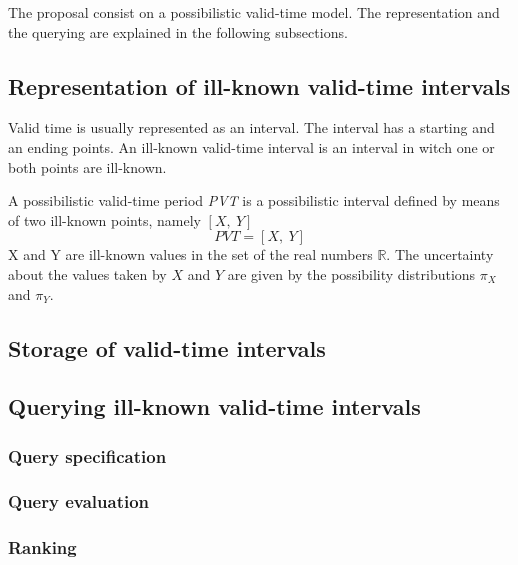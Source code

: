 The proposal consist on a possibilistic valid-time model. The representation and the querying are explained in the following subsections.

\subsection{Representation of ill-known valid-time intervals}
Valid time is usually represented as an interval. The interval has a starting and an ending points. An ill-known valid-time interval is an interval in witch one or both points are ill-known. 

\begin{definition}
A possibilistic valid-time period \emph{PVT} is a possibilistic interval defined by means of two ill-known points, namely $\left[ X,\ Y \right]$
\begin{equation}
PVT = \left[X,\ Y \right] 
\end{equation}
X and Y are ill-known values in the set of the real numbers $\mathbb{R}$. The uncertainty about the values taken by $X$ and $Y$ are given by the possibility distributions $\pi_X$ and $\pi_Y$.
\end{definition}





\subsection{Storage of valid-time intervals}

\subsection{Querying ill-known valid-time intervals}

\subsubsection{Query specification}

\subsubsection{Query evaluation}

\subsubsection{Ranking}